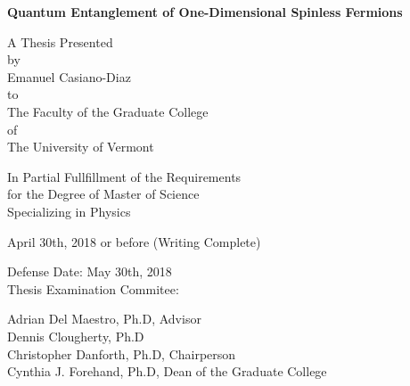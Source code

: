 \documentclass[12pt, two sided]{report}
\begin{document}
\begin{titlepage}
	\begin{center}
		\vspace{1cm}
				
		\Huge
		\textbf{Quantum Entanglement of One-Dimensional Spinless Fermions}
		
		
		\vfill
		
		\normalsize
		A Thesis Presented \\
		\vspace{0.5cm}
		by \\
		\vspace{0.5cm}
		Emanuel Casiano-Diaz \\
		\vspace{0.5cm}
		to \\
		\vspace{0.5cm}
		The Faculty of the Graduate College \\
		\vspace{0.5cm}
		of \\
		\vspace{0.5cm}
		The University of Vermont
		
		\vspace{2.0cm}

	
		In Partial Fullfillment of the Requirements \\
		for the Degree of Master of Science \\
		Specializing in Physics	
			
		\vspace{0.75cm}
		
		April 30th, 2018 or before (Writing Complete)
		
	\end{center}
	
	\vspace{0.5cm}
	
	\begin{flushright}
		Defense Date: May 30th, 2018 \\
		Thesis Examination Commitee:
		
		\vspace{0.5cm}
		
		Adrian Del Maestro, Ph.D, Advisor \\
		Dennis Clougherty, Ph.D \\
		Christopher Danforth, Ph.D, Chairperson \\
		Cynthia J. Forehand, Ph.D, Dean of the Graduate College
		
	
	\end{flushright}
\end{titlepage}
\end{document}
